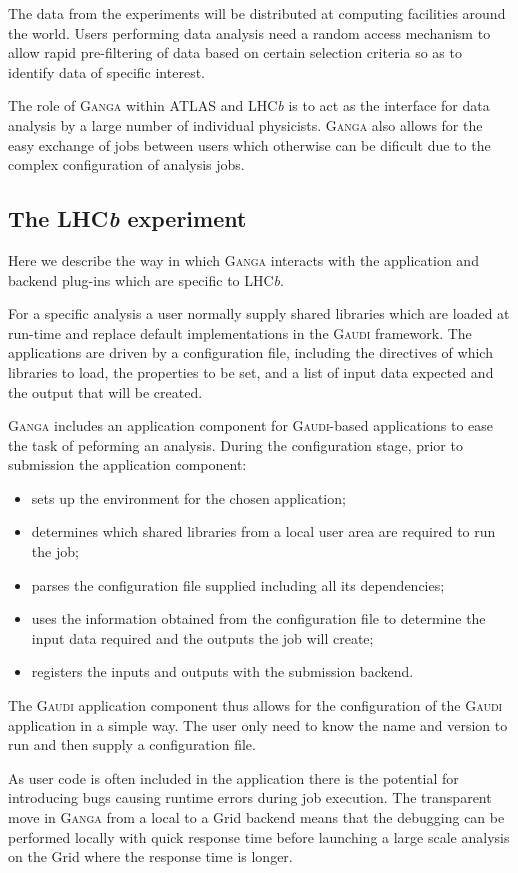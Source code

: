 \documentclass{elsart}
\def\lhcb {LHC{\em b\/}\xspace}
\def\atlas {ATLAS\xspace}
\def\ganga {\textsc{Ganga}\xspace}
\def\gaudi {\textsc{Gaudi}\xspace}
\def\grid {Grid\xspace}
\begin{document}
The data from the experiments will be distributed at computing facilities
around the world. Users performing data analysis need a random access
mechanism to allow rapid pre-filtering of data based on certain selection
criteria so as to identify data of specific interest.

The role of \ganga within \atlas and \lhcb is to act as the interface for data
analysis by a large number of individual physicists. \ganga also allows for
the easy exchange of jobs between users which otherwise can be dificult due to
the complex configuration of analysis jobs.

\subsection{The \lhcb experiment}
\label{sec:lhcb}
Here we describe the way in which \ganga interacts with the application and
backend plug-ins which are specific to \lhcb.

For a specific analysis a user normally supply shared libraries which are
loaded at run-time and replace default implementations in the \gaudi
framework.  The applications are driven by a configuration file, including the
directives of which libraries to load, the properties to be set, and a list of
input data expected and the output that will be created.

\ganga includes an application component for \gaudi-based applications to ease
the task of peforming an analysis. During the configuration stage, prior to
submission the application component:
\begin{itemize}
\item sets up the environment for the chosen application;
\item determines which shared libraries from a local user area are required to
  run the job;
\item parses the configuration file supplied including all its dependencies;
\item uses the information obtained from the configuration file to determine
  the input data required and the outputs the job will create;
\item registers the inputs and outputs with the submission backend.
\end{itemize}
The \gaudi application component thus allows for the configuration of the
\gaudi application in a simple way. The user only need to know the name and
version to run and then supply a configuration file.

As user code is often included in the application there is the potential for
introducing bugs causing runtime errors during job execution. The transparent
move in \ganga from a local to a \grid backend means that the debugging can be
performed locally with quick response time before launching a large scale
analysis on the \grid where the response time is longer.
\end{document}

